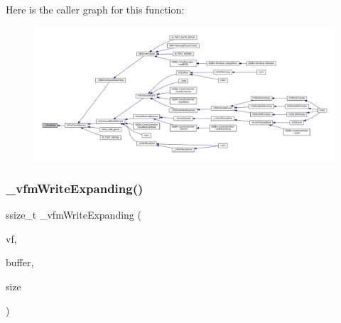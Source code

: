 Here is the caller graph for this function\+:
\nopagebreak
\begin{figure}[H]
\begin{center}
\leavevmode
\includegraphics[width=350pt]{vfs-mem_8c_a04e4a17947fad38e8dc65aa473246595_icgraph}
\end{center}
\end{figure}
\mbox{\label{vfs-mem_8c_af41215a641c6a686b6d1e725a959b7c3}} 
\subsubsection{\texorpdfstring{\+\_\+vfm\+Write\+Expanding()}{\_vfmWriteExpanding()}}
{\footnotesize\ttfamily ssize\+\_\+t \+\_\+vfm\+Write\+Expanding (\begin{DoxyParamCaption}\item[{struct V\+File $\ast$}]{vf,  }\item[{const void $\ast$}]{buffer,  }\item[{size\+\_\+t}]{size }\end{DoxyParamCaption})\hspace{0.3cm}{\ttfamily [static]}}


